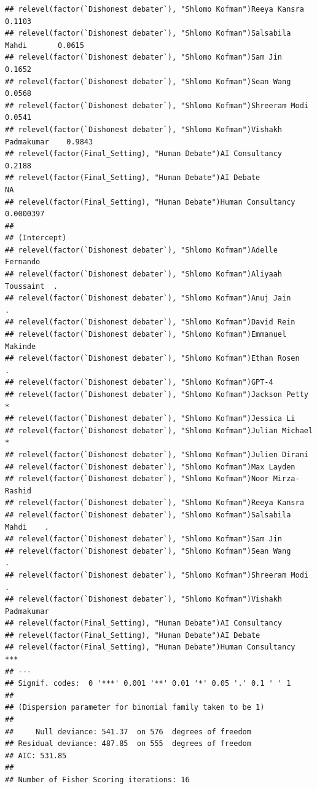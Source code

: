\documentclass[
]{article}
\begin{document}
\begin{verbatim}
## relevel(factor(`Dishonest debater`), "Shlomo Kofman")Reeya Kansra          0.1103
## relevel(factor(`Dishonest debater`), "Shlomo Kofman")Salsabila Mahdi       0.0615
## relevel(factor(`Dishonest debater`), "Shlomo Kofman")Sam Jin               0.1652
## relevel(factor(`Dishonest debater`), "Shlomo Kofman")Sean Wang             0.0568
## relevel(factor(`Dishonest debater`), "Shlomo Kofman")Shreeram Modi         0.0541
## relevel(factor(`Dishonest debater`), "Shlomo Kofman")Vishakh Padmakumar    0.9843
## relevel(factor(Final_Setting), "Human Debate")AI Consultancy               0.2188
## relevel(factor(Final_Setting), "Human Debate")AI Debate                        NA
## relevel(factor(Final_Setting), "Human Debate")Human Consultancy         0.0000397
##                                                                            
## (Intercept)                                                                
## relevel(factor(`Dishonest debater`), "Shlomo Kofman")Adelle Fernando       
## relevel(factor(`Dishonest debater`), "Shlomo Kofman")Aliyaah Toussaint  .  
## relevel(factor(`Dishonest debater`), "Shlomo Kofman")Anuj Jain          .  
## relevel(factor(`Dishonest debater`), "Shlomo Kofman")David Rein            
## relevel(factor(`Dishonest debater`), "Shlomo Kofman")Emmanuel Makinde      
## relevel(factor(`Dishonest debater`), "Shlomo Kofman")Ethan Rosen        .  
## relevel(factor(`Dishonest debater`), "Shlomo Kofman")GPT-4                 
## relevel(factor(`Dishonest debater`), "Shlomo Kofman")Jackson Petty      *  
## relevel(factor(`Dishonest debater`), "Shlomo Kofman")Jessica Li            
## relevel(factor(`Dishonest debater`), "Shlomo Kofman")Julian Michael     *  
## relevel(factor(`Dishonest debater`), "Shlomo Kofman")Julien Dirani         
## relevel(factor(`Dishonest debater`), "Shlomo Kofman")Max Layden            
## relevel(factor(`Dishonest debater`), "Shlomo Kofman")Noor Mirza-Rashid     
## relevel(factor(`Dishonest debater`), "Shlomo Kofman")Reeya Kansra          
## relevel(factor(`Dishonest debater`), "Shlomo Kofman")Salsabila Mahdi    .  
## relevel(factor(`Dishonest debater`), "Shlomo Kofman")Sam Jin               
## relevel(factor(`Dishonest debater`), "Shlomo Kofman")Sean Wang          .  
## relevel(factor(`Dishonest debater`), "Shlomo Kofman")Shreeram Modi      .  
## relevel(factor(`Dishonest debater`), "Shlomo Kofman")Vishakh Padmakumar    
## relevel(factor(Final_Setting), "Human Debate")AI Consultancy               
## relevel(factor(Final_Setting), "Human Debate")AI Debate                    
## relevel(factor(Final_Setting), "Human Debate")Human Consultancy         ***
## ---
## Signif. codes:  0 '***' 0.001 '**' 0.01 '*' 0.05 '.' 0.1 ' ' 1
## 
## (Dispersion parameter for binomial family taken to be 1)
## 
##     Null deviance: 541.37  on 576  degrees of freedom
## Residual deviance: 487.85  on 555  degrees of freedom
## AIC: 531.85
## 
## Number of Fisher Scoring iterations: 16
\end{verbatim}
\end{document}
